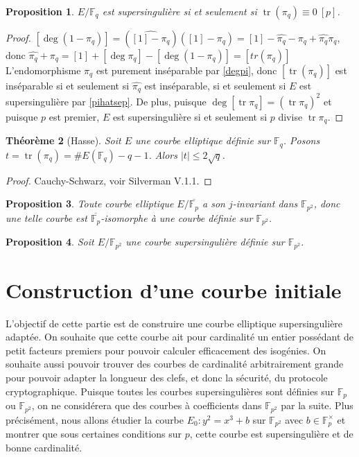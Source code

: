 \documentclass{article}
\theoremstyle{plain}%
\newtheorem{thm}{Théorème}[section]
\newtheorem{prop}[thm]{Proposition}
\theoremstyle{definition}%
\newcommand{\Fp}{\mathbb{F}_{p}}
\newcommand{\Fq}{\mathbb{F}_{p^2}}
\newcommand{\F}{\mathbb{F}}
\DeclareMathOperator{\tr}{tr}
\begin{document}
\begin{prop}
  $E/\F_q$ est supersingulière si et seulement si $\tr(\pi_q) \equiv 0\ [p]$. 
\end{prop}

\begin{proof}
  $[\deg(1-\pi_q)] = (\widehat{[1] - \pi_q})([1]-\pi_q) = [1] - \widehat{\pi_q} - \pi_q + \widehat{\pi_q}\pi_q  $, donc $ \widehat{\pi_q} + \pi_q = [1] + [\deg\pi_q] - [\deg(1-\pi_q)] = [tr(\pi_q)]  $ 
  L'endomorphisme $\pi_q$ est purement inséparable par \ref{degpi}, donc $[\tr(\pi_q)]$ est inséparable si et seulement si $\widehat{\pi_q}$ est inséparable, si et seulement si $E$ est supersingulière par \ref{pihatsep}. De plus, puisque $\deg[\tr \pi_q] =(\tr \pi_q)^2$ et puisque $p$ est premier, $E$ est supersingulière si et seulement si $p$ divise $\tr\pi_q$. 
\end{proof}


\begin{thm}[Hasse]
  Soit $E$ une courbe elliptique définie sur $\F_q$. Posons $t = \tr(\pi_q) = \# E(\F_q) - q -1$. Alors $|t| \le 2\sqrt{q}$.
\end{thm}

\begin{proof}
  Cauchy-Schwarz, voir Silverman V.1.1.  
\end{proof}

\begin{prop}
  Toute courbe elliptique $E/\overline{\F_p}$ a son $j$-invariant dans $\F_{p^2}$, donc une telle courbe est $\overline{\F_p}$-isomorphe à une courbe définie sur $\F_{p^2}$. 
\end{prop}

\begin{prop}
  Soit $E/\F_{p^2}$ une courbe supersingulière définie sur $\F_{p^2}$. 
\end{prop}


\section{Construction d'une courbe initiale}

L'objectif de cette partie est de construire une courbe elliptique supersingulière adaptée. 
On souhaite que cette courbe ait pour cardinalité un entier possédant de petit facteurs premiers pour pouvoir calculer efficacement des isogénies. 
On souhaite aussi pouvoir trouver des courbes de cardinalité arbitrairement grande pour pouvoir adapter la longueur des clefs, et donc la sécurité, du protocole cryptographique.
Puisque toutes les courbes supersingulières sont définies sur $\Fp$ ou $\Fq$, on ne considérera que des courbes à coefficients dans $\Fq$ par la suite.
Plus précisément, nous allons étudier la courbe $E_0 : y^2 = x^3 + b$ sur $\Fq$ avec $b\in\Fp^\times$ et montrer que sous certaines conditions sur $p$, cette courbe est supersingulière et de bonne cardinalité.
\end{document}
